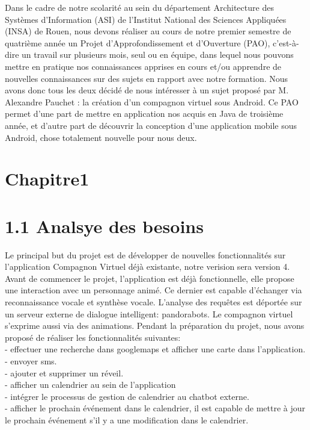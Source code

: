 \documentclass[pdftex, a4paper,12pt]{report}
\begin{document}
Dans le cadre de notre scolarité au sein du département Architecture des Systèmes d’Information (ASI) de l’Institut National des Sciences Appliquées (INSA) de Rouen, nous devons réaliser au cours de notre premier semestre de quatrième année un Projet d’Approfondissement et d’Ouverture (PAO), c’est-à-dire un travail sur plusieurs mois, seul ou en équipe, dans lequel nous pouvons mettre en pratique nos connaissances apprises en cours et/ou apprendre de nouvelles connaissances sur des sujets en rapport avec notre formation.
Nous avons donc tous les deux décidé de nous intéresser à un sujet proposé par M. Alexandre Pauchet : la création d’un compagnon virtuel sous Android. Ce PAO permet d’une part de mettre en application nos acquis en Java de troisième année, et d’autre part de découvrir la conception d’une application mobile sous Android, chose totalement nouvelle pour nous deux.
\newpage

\section*{Chapitre1}
\section*{1.1 Analsye des besoins}
Le principal but du projet est de développer de nouvelles fonctionnalités sur l'application Compagnon Virtuel déjà existante, notre verision sera version 4.
Avant de commencer le projet, l'application est déjà fonctionnelle, elle propose une interaction avec un personnage animé. Ce dernier est capable d'échanger via reconnaissance vocale et synthèse vocale. L'analyse des requêtes est déportée sur un serveur externe de dialogue intelligent: pandorabots. Le compagnon virtuel s'exprime aussi via des animations. Pendant la préparation du projet, nous avons proposé de réaliser les fonctionnalités suivantes:\\
	\indent- effectuer une recherche dans googlemaps et afficher une carte dans l'application.\\
	\indent- envoyer sms.\\
	\indent- ajouter et supprimer un réveil.\\
	\indent- afficher un calendrier au sein de l'application\\
	\indent- intégrer le processus de gestion de calendrier au chatbot externe.\\
	\indent- afficher le prochain événement dans le calendrier, il est capable de mettre à jour le prochain événement s'il y a une modification dans le calendrier.\\
	
\end{document}
